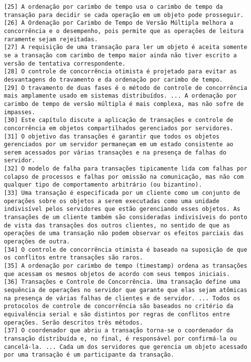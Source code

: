 \documentclass[12pt, a4paper]{article}
\begin{document}
\begin{appendix}
\begin{Verbatim}[frame=single, label={Excertos da Fonte: Sistemas Distribuídos, 5ª Edição (Coulouris et al.)}]
[25] A ordenação por carimbo de tempo usa o carimbo de tempo da transação para decidir se cada operação em um objeto pode prosseguir.
[26] A Ordenação por Carimbo de Tempo de Versão Múltipla melhora a concorrência e o desempenho, pois permite que as operações de leitura raramente sejam rejeitadas.
[27] A requisição de uma transação para ler um objeto é aceita somente se a transação com carimbo de tempo maior ainda não tiver escrito a versão de tentativa correspondente.
[28] O controle de concorrência otimista é projetado para evitar as desvantagens do travamento e da ordenação por carimbo de tempo.
[29] O travamento de duas fases é o método de controle de concorrência mais amplamente usado em sistemas distribuídos. ... A ordenação por carimbo de tempo de versão múltipla é mais complexa, mas não sofre de impasses.
[30] Este capítulo discute a aplicação de transações e controle de concorrência em objetos compartilhados gerenciados por servidores.
[31] O objetivo das transações é garantir que todos os objetos gerenciados por um servidor permaneçam em um estado consistente ao serem acessados por várias transações e na presença de falhas do servidor.
[32] O modelo de falha para transações tipicamente lida com falhas por colapso de processos e falhas por omissão na comunicação, mas não com qualquer tipo de comportamento arbitrário (ou bizantino).
[33] Uma transação é especificada por um cliente como um conjunto de operações sobre os objetos a serem executadas como uma unidade indivisível pelos servidores que estão gerenciando esses objetos. As transações de um cliente também são consideradas indivisíveis do ponto de vista das transações dos outros clientes, no sentido de que as operações de uma transação não podem observar os efeitos parciais das operações de outra.
[34] O controle de concorrência otimista é baseado na suposição de que os conflitos entre transações são raros.
[35] A ordenação por carimbo de tempo (timestamp) ordena as transações que acessam os mesmos objetos de acordo com seus tempos iniciais.
[36] Transações e Controle de Concorrência. Uma transação define uma sequência de operações no servidor que garante que elas sejam atômicas na presença de várias falhas de clientes e de servidor. ... Todos os protocolos de controle de concorrência são baseados no critério da equivalência serial e são distintos por regras de conflitos entre operações. Serão descritos três métodos.
[37] O coordenador que abriu a transação torna-se o coordenador da transação distribuída e, no final, é responsável por confirmá-la ou cancelá-la. ... Cada um dos servidores que gerencia um objeto acessado por uma transação é um participante da transação.

\end{Verbatim}
\end{appendix}
\end{document}
